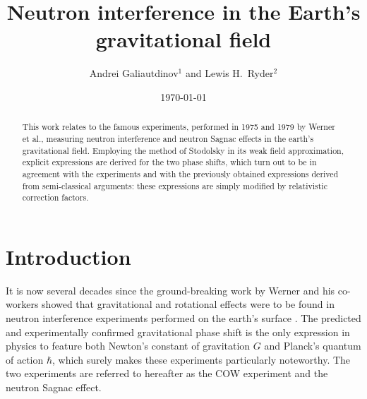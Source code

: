 \documentclass[twocolumn,reprint,amsmath,amssymb]{revtex4}
\begin{document}

\title{Neutron interference in the Earth's gravitational field}

\author{Andrei Galiautdinov$^1$ and Lewis H.\ Ryder$^2$}

\date{\today}%

\begin{abstract}

This work relates to the famous experiments, performed in 1975 and 1979 by Werner et al., measuring neutron interference and neutron Sagnac effects in the earth's gravitational field. Employing the method of Stodolsky in its weak field approximation, explicit expressions are derived for the two phase shifts, which turn out to be in agreement with the experiments and with the previously obtained expressions derived from semi-classical arguments: these expressions are simply modified by relativistic correction factors.


\end{abstract}


\maketitle



\allowdisplaybreaks[1]

\section{Introduction}

It is now several decades since the ground-breaking work by Werner and his
co-workers showed that gravitational \cite{1.0, 1} and rotational \cite{2} effects were to be
found in neutron interference experiments performed on the earth's surface \cite{2.1, 2.2, 2.3}. The
predicted and experimentally confirmed gravitational phase shift is the only
expression in physics to feature both Newton's constant of gravitation $G$ and
Planck's quantum of action $\hbar$, which surely makes these experiments particularly
noteworthy. The two experiments are referred to hereafter as the COW experiment and
the neutron Sagnac effect.
\end{document}
